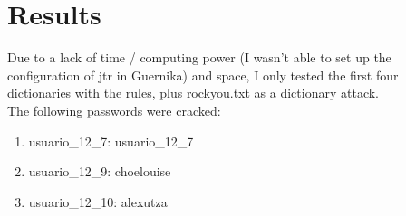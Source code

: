 \section{Results}
Due to a lack of time / computing power (I wasn't able to set up the configuration of jtr in Guernika) and space, I only tested the first four dictionaries with the rules, plus rockyou.txt as a dictionary attack.\\

The following passwords were cracked:
\begin{enumerate}
    \item usuario\_12\_7: usuario\_12\_7
    \item usuario\_12\_9: choelouise
    \item usuario\_12\_10: alexutza
\end{enumerate}

